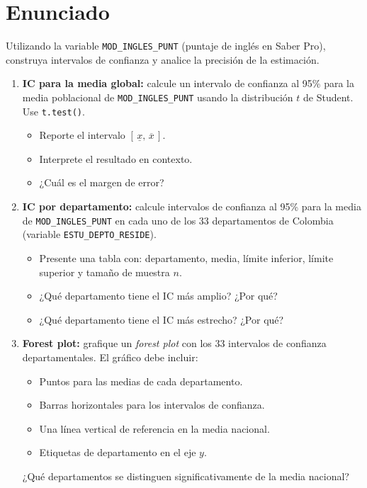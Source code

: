 \documentclass[11pt, a4paper]{article}
\begin{document}
\section*{Enunciado}

Utilizando la variable \texttt{MOD\_INGLES\_PUNT} (puntaje de ingl\'es en Saber Pro),
construya intervalos de confianza y analice la precisi\'on de la estimaci\'on.

\begin{enumerate}[label=\alph*)]
  \item \textbf{IC para la media global:} calcule un intervalo de confianza al
        95\% para la media poblacional de \texttt{MOD\_INGLES\_PUNT} usando la
        distribuci\'on $t$ de Student. Use \texttt{t.test()}.
        \begin{itemize}
          \item Reporte el intervalo $[\,\underline{x},\, \overline{x}\,]$.
          \item Interprete el resultado en contexto.
          \item ¿Cu\'al es el margen de error?
        \end{itemize}

  \item \textbf{IC por departamento:} calcule intervalos de confianza al 95\%
        para la media de \texttt{MOD\_INGLES\_PUNT} en cada uno de los 33 departamentos
        de Colombia (variable \texttt{ESTU\_DEPTO\_RESIDE}).
        \begin{itemize}
          \item Presente una tabla con: departamento, media, l\'imite inferior,
                l\'imite superior y tama\~no de muestra $n$.
          \item ¿Qu\'e departamento tiene el IC m\'as amplio? ¿Por qu\'e?
          \item ¿Qu\'e departamento tiene el IC m\'as estrecho? ¿Por qu\'e?
        \end{itemize}

  \item \textbf{Forest plot:} grafique un \textit{forest plot} con los 33 intervalos
        de confianza departamentales. El gr\'afico debe incluir:
        \begin{itemize}
          \item Puntos para las medias de cada departamento.
          \item Barras horizontales para los intervalos de confianza.
          \item Una l\'inea vertical de referencia en la media nacional.
          \item Etiquetas de departamento en el eje $y$.
        \end{itemize}
        ¿Qu\'e departamentos se distinguen significativamente de la media nacional?


\end{enumerate}
\end{document}
